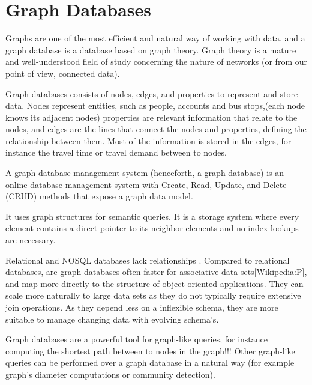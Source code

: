 \section{Graph Databases}

Graphs are one of the most efficient and natural way of working with data, and a graph database is a database based on graph theory. Graph theory is a mature and well-understood field of study concerning the nature of
networks (or from our point of view, connected data)\citep{neo13}. 

Graph databases consists of nodes, edges, and properties to represent and store data. Nodes represent entities, such as people, accounts and bus stops,(each node knows its adjacent nodes) properties are relevant information that relate to the nodes, and edges are the lines that connect the nodes and properties, defining the relationship between them. Most of the information is stored in the edges, for instance the travel time or travel demand between to nodes. 

A graph database management system (henceforth, a graph database) is an online database management system with Create, Read, Update, and Delete (CRUD) methods that expose a graph data model. 

It uses graph structures for semantic queries. It is a storage system where every element contains a direct pointer to its neighbor elements and no index lookups are necessary. 

\par %

Relational and NOSQL databases lack relationships \citep{neo13}. Compared to relational databases, are graph databases often faster for associative data sets[Wikipedia:P], and map more directly to the structure of object-oriented applications. They can scale more naturally to large data sets as they do not typically require extensive join operations. As they depend less on a inflexible schema, they are more suitable to manage changing data with evolving schema's.

\par
Graph databases are a powerful tool for graph-like queries, for instance computing the shortest path between to nodes in the graph!!! Other graph-like queries can be performed over a graph database in a natural way (for example graph's diameter computations or community detection).

